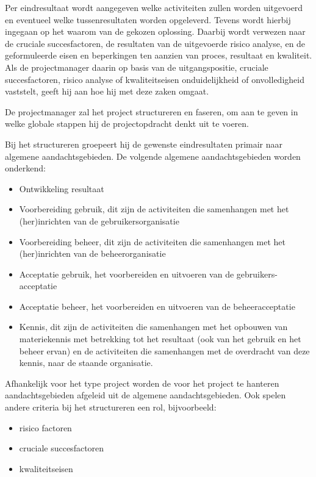 \documentclass{article}
\begin{document}
Per eindresultaat wordt aangegeven welke activiteiten zullen worden uitgevoerd en eventueel welke tussenresultaten worden opgeleverd.
Tevens wordt hierbij ingegaan op het waarom van de gekozen oplossing.
Daarbij wordt verwezen naar de cruciale succesfactoren, de resultaten van de uitgevoerde risico analyse,
en de geformuleerde eisen en beperkingen ten aanzien van proces, resultaat en kwaliteit.
Als de projectmanager daarin op basis van de uitgangspositie, cruciale succesfactoren,
risico analyse of kwaliteitseisen onduidelijkheid of onvolledigheid vaststelt, geeft hij aan hoe hij met deze zaken omgaat.

De projectmanager zal het project structureren en faseren,
om aan te geven in welke globale stappen hij de projectopdracht denkt uit te voeren.

Bij het structureren groepeert hij de gewenste eindresultaten primair naar algemene aandachtsgebieden.
De volgende algemene aandachtsgebieden worden onderkend:

\begin{itemize}
  \item Ontwikkeling resultaat
  \item Voorbereiding gebruik, dit zijn de activiteiten die samenhangen met het (her)inrichten van de gebruikersorganisatie
  \item Voorbereiding beheer, dit zijn de activiteiten die samenhangen met het (her)inrichten van de beheerorganisatie
  \item Acceptatie gebruik, het voorbereiden en uitvoeren van de gebruikers-acceptatie
  \item Acceptatie beheer, het voorbereiden en uitvoeren van de beheeracceptatie
  \item Kennis, dit zijn de activiteiten die samenhangen met het opbouwen van materiekennis met betrekking tot het resultaat
  (ook van het gebruik en het beheer ervan) en de activiteiten die samenhangen met de overdracht van deze kennis,
  naar de staande organisatie.
\end{itemize}

Afhankelijk voor het type project worden de voor het project te hanteren aandachtsgebieden afgeleid uit de algemene aandachtsgebieden.
Ook spelen andere criteria bij het structureren een rol, bijvoorbeeld:

\begin{itemize}
  \item risico factoren
  \item cruciale succesfactoren
  \item kwaliteitseisen
\end{itemize}
\end{document}
